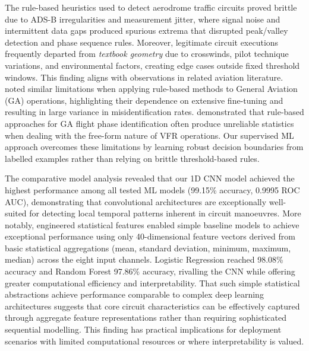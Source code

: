 \documentclass[
  manuscript=proceedings,  %
  layout=preprint,         %
  year=2025,
  volume=x,
]{extra/joas}
\begin{document}
The rule-based heuristics used to detect aerodrome traffic circuits proved brittle due to ADS-B irregularities and measurement jitter, where signal noise and intermittent data gaps produced spurious extrema that disrupted peak/valley detection and phase sequence rules. Moreover, legitimate circuit executions frequently departed from \textit{textbook geometry} due to crosswinds, pilot technique variations, and environmental factors, creating edge cases outside fixed threshold windows. This finding aligns with observations in related aviation literature. \textcite{fala_ml_2023} noted similar limitations when applying rule-based methods to General Aviation (GA) operations, highlighting their dependence on extensive fine-tuning and resulting in large variance in misidentification rates. \textcite{zhang_ga_phase_2022} demonstrated that rule-based approaches for GA flight phase identification often produce unreliable statistics when dealing with the free-form nature of VFR operations. Our supervised ML approach overcomes these limitations by learning robust decision boundaries from labelled examples rather than relying on brittle threshold-based rules.

The comparative model analysis revealed that our 1D CNN model achieved the highest performance among all tested ML models (99.15\% accuracy, 0.9995 ROC AUC), demonstrating that convolutional architectures are exceptionally well-suited for detecting local temporal patterns inherent in circuit manoeuvres. More notably, engineered statistical features enabled simple baseline models to achieve exceptional performance using only 40-dimensional feature vectors derived from basic statistical aggregations (mean, standard deviation, minimum, maximum, median) across the eight input channels. Logistic Regression reached 98.08\% accuracy and Random Forest 97.86\% accuracy, rivalling the CNN while offering greater computational efficiency and interpretability. That such simple statistical abstractions achieve performance comparable to complex deep learning architectures suggests that core circuit characteristics can be effectively captured through aggregate feature representations rather than requiring sophisticated sequential modelling. This finding has practical implications for deployment scenarios with limited computational resources or where interpretability is valued.
\end{document}
